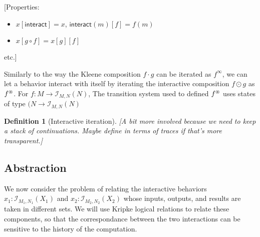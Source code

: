 \documentclass{article}
\newtheorem{definition}{Definition}
\newcommand{\kw}[1]{\ensuremath{ \mathsf{#1} }}
\begin{document}
[Properties:
\begin{itemize}
\item $x[\kw{interact}] = x$, $\kw{interact}(m)[f] = f(m)$
\item $x[g \circ f] = x[g][f]$
\end{itemize}
etc.]

Similarly to the way
the Kleene composition $f \cdot g$ can be iterated as $f^\infty$,
we can let a behavior interact with itself
by iterating the interactive composition $f \odot g$ as $f^\oast$.
For $f : M \rightarrow \mathcal{I}_{M,N}(N)$,
The transition system used to defined $f^\oast$
uses states of type $(N \rightarrow \mathcal{I}_{M,N}(N)$

\begin{definition}[Interactive iteration]
[A bit more involved because we need to keep a stack of continuations.
Maybe define in terms of traces if that's more transparent.]
\end{definition}


\subsection{Abstraction} \label{sec:monad:abs} %

We now consider the problem of relating the interactive behaviors
$x_1 : \mathcal{I}_{M_1,N_1}(X_1)$ and
$x_2 : \mathcal{I}_{M_2,N_2}(X_2)$
whose inputs, outputs, and results are taken in different sets.
We will use Kripke logical relations to relate these components,
so that the correspondance between the two interactions
can be sensitive to the history of the computation.
\end{document}
